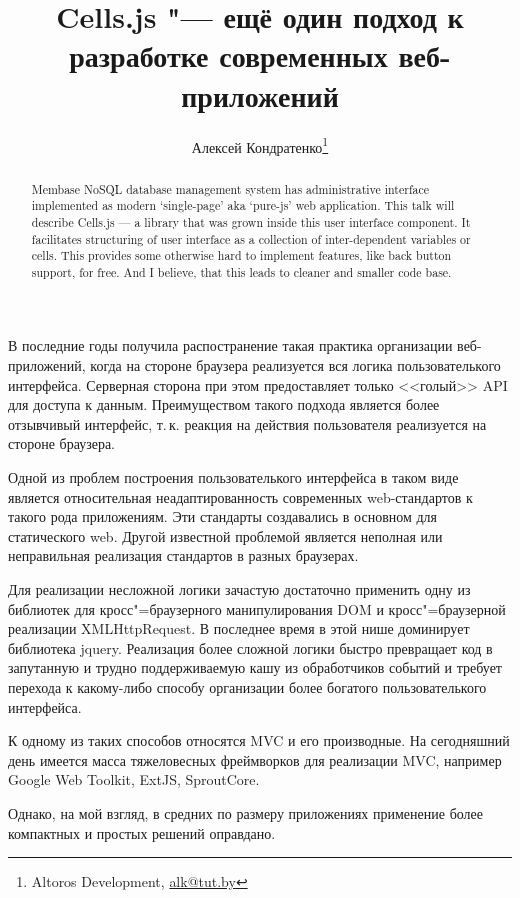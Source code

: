 \documentclass[10pt, a5paper]{article}
\begin{document}
\title{Cells.js "--- ещё один подход к разработке современных веб-приложений}

\author{Алексей Кондратенко\footnote{Altoros Development, \url{alk@tut.by}}}
\maketitle

\begin{abstract}
Membase NoSQL database management system has admi\-ni\-stra\-tive interface 
implemented as modern `single-page' aka `pure-js' web application. 
This talk will describe Cells.js --- a library that was grown inside 
this user interface component. It facilitates structuring of user 
interface as a collection of inter-dependent variables or cells. This 
provides some otherwise hard to implement features, like back button 
support, for free. And I believe, that this leads to cleaner and smaller 
code base.
\end{abstract}

В последние годы получила распостранение такая практика организации
веб-приложений, когда на стороне браузера реализуется вся логика
пользователького интерфейса. Серверная сторона при этом предоставляет
только <<голый>> API для доступа к данным. Преимуществом такого подхода
является более отзывчивый интерфейс, т.\,к. реакция на действия
пользователя реализуется на стороне браузера.

Одной из проблем построения пользователького интерфейса в таком виде
является относительная неадаптированность современных web-стандартов
к такого рода приложениям. Эти стандарты создавались в основном для
статического web. Другой известной проблемой является неполная или
неправильная реализация стандартов в разных браузерах.

Для реализации несложной логики зачастую достаточно применить одну из
библиотек для кросс"=браузерного манипулирования DOM и кросс"=браузерной
реализации XMLHttpRequest. В последнее время в этой нише доминирует
библиотека jquery. Реализация более сложной логики быстро превращает
код в запутанную и трудно поддерживаемую кашу из обработчиков событий и 
требует перехода к какому-либо способу организации более богатого
пользователького интерфейса.

К одному из таких способов относятся MVC и его производные. На
сегодняшний день имеется масса тяжеловесных фреймворков для
реализации MVC, например Google Web Toolkit, ExtJS, SproutCore.

Однако, на мой взгляд, в средних по размеру приложениях применение более
компактных и простых решений оправдано.
\end{document}
